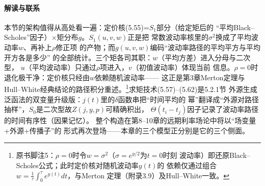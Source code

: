 \paragraph{解读与联系}
本节的架构值得从高处看一遍：定价核(5.55)=$S_{1}$部分（给定矩后的
“平均Black--Scholes”因子）$\times$矩分布$g$。$S_{1}(u,v,w)$正是把
常数波动率核里的$\sigma^{2}$换成了平均波动率$w$、再补上$\rho$修正项
的产物；而$g(u,v,w)$编码“波动率路径的平均平方与平均开方各是多少”
的全部统计。三个矩各司其职：$w$（平均方差）进入分母与二次型，
$u$（平均波动率）只通过$\rho$项进入，$v$（初值波动率）体现当前
信息。$\rho=0$时退化极干净：定价核只经由$w$依赖随机波动率——
这正是第3章Merton定理与Hull--White经典结论的路径积分重述。\footnote{%
原书脚注5：$\rho=0$时令$w=\sigma^{2}$（$\sigma=e^{y/2}$为$t=0$时刻
波动率）即还原Black--Scholes公式；此时定价核对随机波动率$y(t)$的
依赖仅通过组合$w=\frac{1}{\tau}\int_{0}^{\tau}e^{y(t)}dt$，与Merton
定理（附录3.9）及Hull--White一致。}求矩技术(5.57)--(5.62)是5.2.1节
外源生成泛函法的双变量升级版：$j(t)$里的$\delta$函数串把“时间平均的
幂”翻译成“外源对路径抽样”，$S_{0}$是二次型故$Z(j,y,p)$可精确积出，
$\Theta(t_{i}-t_{j})$因子记录了波动率路径的时间有序性（因果记忆）。
整个构造在第8--10章的远期利率场论中将以“场变量+外源+传播子”的
形式再次登场——本章的三个模型正分别是它的三个侧面。


